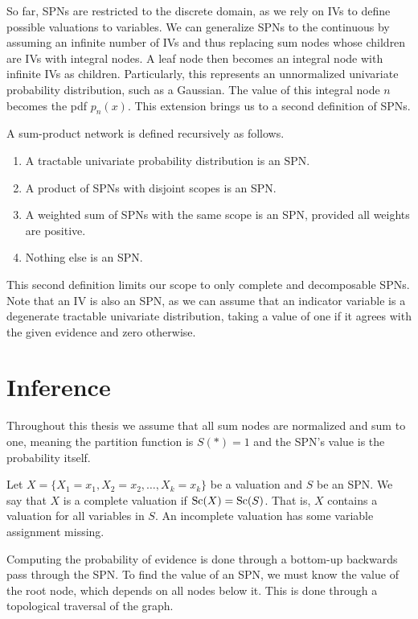 So far, SPNs are restricted to the discrete domain, as we rely on IVs to define possible valuations
to variables. We can generalize SPNs to the continuous by assuming an infinite number of IVs and
thus replacing sum nodes whose children are IVs with integral nodes. A leaf node then becomes an
integral node with infinite IVs as children. Particularly, this represents an unnormalized
univariate probability distribution, such as a Gaussian. The value of this integral node $n$
becomes the pdf $p_n(x)$. This extension brings us to a second definition of SPNs.

\begin{definition}
  A sum-product network is defined recursively as follows.
  \begin{enumerate}[noitemsep]
    \item A tractable univariate probability distribution is an SPN\@.
    \item A product of SPNs with disjoint scopes is an SPN\@.
    \item A weighted sum of SPNs with the same scope is an SPN, provided all weights are positive.
    \item Nothing else is an SPN\@.
  \end{enumerate}
\end{definition}

This second definition limits our scope to only complete and decomposable SPNs. Note that an IV is
also an SPN, as we can assume that an indicator variable is a degenerate tractable univariate
distribution, taking a value of one if it agrees with the given evidence and zero otherwise.

\section{Inference}

Throughout this thesis we assume that all sum nodes are normalized and sum to one, meaning the
partition function is $S(\ast)=1$ and the SPN's value is the probability itself.

Let $X=\{X_1=x_1,X_2=x_2,\ldots,X_k=x_k\}$ be a valuation and $S$ be an SPN\@. We say that $X$ is a
complete valuation if $\operatorname*{\text{Sc}}(X)=\operatorname*{\text{Sc}}(S)$. That is, $X$ contains a valuation for all variables in $S$.
An incomplete valuation has some variable assignment missing.

Computing the probability of evidence is done through a bottom-up backwards pass through the SPN\@.
To find the value of an SPN, we must know the value of the root node, which depends on all nodes
below it. This is done through a topological traversal of the graph.

